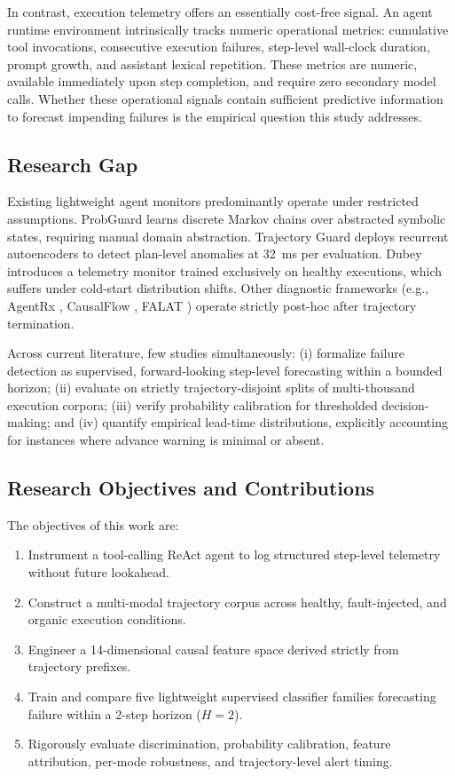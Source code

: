 \documentclass[journal,compsoc]{IEEEtran}
\begin{document}
In contrast, execution telemetry offers an essentially cost-free signal. An agent runtime environment intrinsically tracks numeric operational metrics: cumulative tool invocations, consecutive execution failures, step-level wall-clock duration, prompt growth, and assistant lexical repetition. These metrics are numeric, available immediately upon step completion, and require zero secondary model calls. Whether these operational signals contain sufficient predictive information to forecast impending failures is the empirical question this study addresses.

\subsection{Research Gap}
Existing lightweight agent monitors predominantly operate under restricted assumptions. ProbGuard \cite{wang2025probguard} learns discrete Markov chains over abstracted symbolic states, requiring manual domain abstraction. Trajectory Guard \cite{advani2026trajectory} deploys recurrent autoencoders to detect plan-level anomalies at 32~ms per evaluation. Dubey \cite{dubey2026realtime} introduces a telemetry monitor trained exclusively on healthy executions, which suffers under cold-start distribution shifts. Other diagnostic frameworks (e.g., AgentRx \cite{barke2026agentrx}, CausalFlow \cite{bonagiri2026causalflow}, FALAT \cite{rafi2026falat}) operate strictly post-hoc after trajectory termination.

Across current literature, few studies simultaneously: (i) formalize failure detection as supervised, forward-looking step-level forecasting within a bounded horizon; (ii) evaluate on strictly trajectory-disjoint splits of multi-thousand execution corpora; (iii) verify probability calibration for thresholded decision-making; and (iv) quantify empirical lead-time distributions, explicitly accounting for instances where advance warning is minimal or absent.

\subsection{Research Objectives and Contributions}
The objectives of this work are:
\begin{enumerate}
    \item Instrument a tool-calling ReAct agent to log structured step-level telemetry without future lookahead.
    \item Construct a multi-modal trajectory corpus across healthy, fault-injected, and organic execution conditions.
    \item Engineer a 14-dimensional causal feature space derived strictly from trajectory prefixes.
    \item Train and compare five lightweight supervised classifier families forecasting failure within a 2-step horizon ($H=2$).
    \item Rigorously evaluate discrimination, probability calibration, feature attribution, per-mode robustness, and trajectory-level alert timing.
\end{enumerate}
\end{document}
